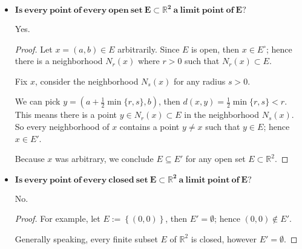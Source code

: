 \begin{Exercise}
	\begin{itemize}
		\item $\mathbf{Is\ every\ point\ of\ every\ open\ set\ E \subset \mathbb{R}^2\ a\ limit\ point\ of\ E?}$
		\begin{answer}
			Yes.
		\end{answer}
		\begin{proof}
			Let $x = (a, b)\in E$ arbitrarily. 
			Since $E$ is open, then $x\in E^{\circ}$; hence there is a neighborhood $N_r(x)$ where $r>0$ such that $N_r(x)\subset E$.
			
			Fix $x$, consider the neighborhood $N_s(x)$ for any radius $s>0$. 
			
			We can pick $y = \left( a+\frac{1}{2}\min\{r,s\}, b \right)$, then $d(x,y) = \frac{1}{2}\min\{r,s\} < r$. 
			This means there is a point $y\in N_r(x) \subset E$ in the neighborhood $N_s(x)$. 
			So every neighborhood of $x$ contains a point $y\neq x$ such that $y\in E$; hence $x\in E'$.
			
			Because $x$ was arbitrary, we conclude $E \subseteq E'$ for any open set $E\subset \mathbb{R}^2$.
		\end{proof}
		
		\item $\mathbf{Is\ every\ point\ of\ every\ closed\ set\ E \subset \mathbb{R}^2\ a\ limit\ point\ of\ E?}$
		\begin{answer}
			No.
		\end{answer}
		\begin{proof}
			For example, let $E := \left\{ (0,0) \right\}$, then $E' = \emptyset$; hence $(0,0)\notin E'$.
			
			Generally speaking, every finite subset $E$ of $\mathbb{R}^2$ is closed, however $E' = \emptyset$. 
		\end{proof}
	\end{itemize}
\end{Exercise}